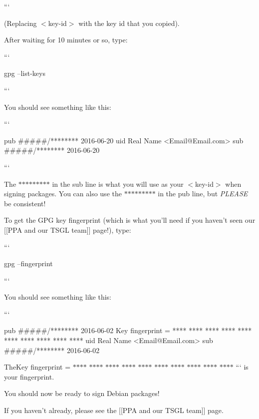 ```

(Replacing {\ttfamily $<$key-\/id$>$} with the key id that you copied).

After waiting for 10 minutes or so, type\-:

``` \begin{DoxyVerb}gpg --list-keys
\end{DoxyVerb}


```

You should see something like this\-:

``` \begin{DoxyVerb}pub   #####/******** 2016-06-20
uid                  Real Name <Email@Email.com>
sub   #####/******** 2016-06-20
\end{DoxyVerb}


```

The {\ttfamily $\ast$$\ast$$\ast$$\ast$$\ast$$\ast$$\ast$$\ast$$\ast$} in the {\ttfamily sub} line is what you will use as your {\ttfamily $<$key-\/id$>$} when signing packages. You can also use the {\ttfamily $\ast$$\ast$$\ast$$\ast$$\ast$$\ast$$\ast$$\ast$$\ast$} in the {\ttfamily pub} line, but {\itshape P\-L\-E\-A\-S\-E} be consistent!

To get the G\-P\-G key fingerprint (which is what you'll need if you haven't seen our \mbox{[}\mbox{[}P\-P\-A and our T\-S\-G\-L team\mbox{]}\mbox{]} page!), type\-:

``` \begin{DoxyVerb}gpg --fingerprint
\end{DoxyVerb}


```

You should see something like this\-:

``` \begin{DoxyVerb}pub   #####/******** 2016-06-02
      Key fingerprint = **** **** **** **** ****  **** **** **** **** ****
uid                  Real Name <Email@Email.com>
sub   #####/******** 2016-06-02
\end{DoxyVerb}


{\ttfamily  The}Key fingerprint = $\ast$$\ast$$\ast$$\ast$ $\ast$$\ast$$\ast$$\ast$ $\ast$$\ast$$\ast$$\ast$ $\ast$$\ast$$\ast$$\ast$ $\ast$$\ast$$\ast$$\ast$ $\ast$$\ast$$\ast$$\ast$ $\ast$$\ast$$\ast$$\ast$ $\ast$$\ast$$\ast$$\ast$ $\ast$$\ast$$\ast$$\ast$ $\ast$$\ast$$\ast$$\ast$ ``` is your fingerprint.

You should now be ready to sign Debian packages!

If you haven't already, please see the \mbox{[}\mbox{[}P\-P\-A and our T\-S\-G\-L team\mbox{]}\mbox{]} page.

